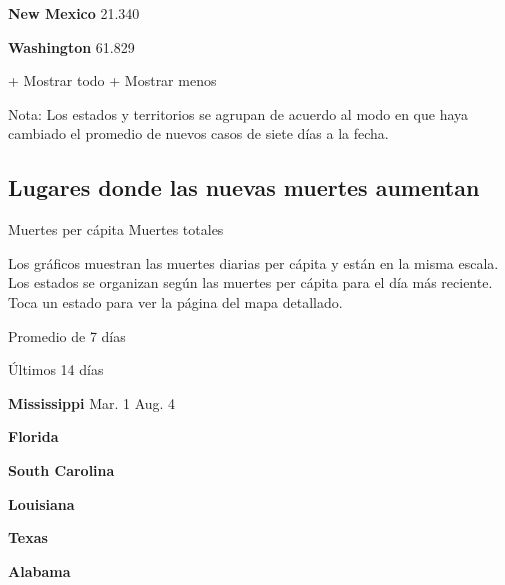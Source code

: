 \href{https://www.nytimes.com/interactive/2020/us/new-mexico-coronavirus-cases.html}{}

\textbf{New Mexico} 21.340

\href{https://www.nytimes.com/interactive/2020/us/washington-coronavirus-cases.html}{}

\textbf{Washington} 61.829

+ Mostrar todo + Mostrar menos

Nota: Los estados y territorios se agrupan de acuerdo al modo en que
haya cambiado el promedio de nuevos casos de siete días a la fecha.

\hypertarget{lugares-donde-las-nuevas-muertes-aumentan}{%
\subsection{Lugares donde las nuevas muertes
aumentan}\label{lugares-donde-las-nuevas-muertes-aumentan}}

Muertes per cápita Muertes totales

Los gráficos muestran las muertes diarias per cápita y están en la misma
escala. Los estados se organizan según las muertes per cápita para el
día más reciente. Toca un estado para ver la página del mapa detallado.

\href{https://www.nytimes.com/interactive/2020/us/mississippi-coronavirus-cases.html}{}

Promedio de 7 días

Últimos 14 días

\textbf{Mississippi} Mar. 1 Aug. 4

\href{https://www.nytimes.com/interactive/2020/us/florida-coronavirus-cases.html}{}

\textbf{Florida}

\href{https://www.nytimes.com/interactive/2020/us/south-carolina-coronavirus-cases.html}{}

\textbf{South Carolina}

\href{https://www.nytimes.com/interactive/2020/us/louisiana-coronavirus-cases.html}{}

\textbf{Louisiana}

\href{https://www.nytimes.com/interactive/2020/us/texas-coronavirus-cases.html}{}

\textbf{Texas}

\href{https://www.nytimes.com/interactive/2020/us/alabama-coronavirus-cases.html}{}

\textbf{Alabama}

\href{https://www.nytimes.com/interactive/2020/us/nevada-coronavirus-cases.html}{}

